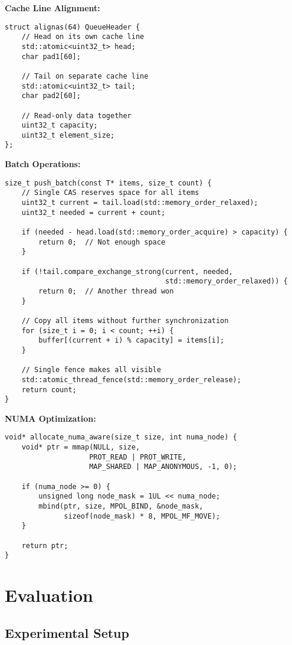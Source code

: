 \documentclass[11pt]{article}
\begin{document}
\textbf{Cache Line Alignment:}
\begin{lstlisting}
struct alignas(64) QueueHeader {
    // Head on its own cache line
    std::atomic<uint32_t> head;
    char pad1[60];
    
    // Tail on separate cache line  
    std::atomic<uint32_t> tail;
    char pad2[60];
    
    // Read-only data together
    uint32_t capacity;
    uint32_t element_size;
};
\end{lstlisting}

\textbf{Batch Operations:}
\begin{lstlisting}
size_t push_batch(const T* items, size_t count) {
    // Single CAS reserves space for all items
    uint32_t current = tail.load(std::memory_order_relaxed);
    uint32_t needed = current + count;
    
    if (needed - head.load(std::memory_order_acquire) > capacity) {
        return 0;  // Not enough space
    }
    
    if (!tail.compare_exchange_strong(current, needed,
                                      std::memory_order_relaxed)) {
        return 0;  // Another thread won
    }
    
    // Copy all items without further synchronization
    for (size_t i = 0; i < count; ++i) {
        buffer[(current + i) % capacity] = items[i];
    }
    
    // Single fence makes all visible
    std::atomic_thread_fence(std::memory_order_release);
    return count;
}
\end{lstlisting}

\textbf{NUMA Optimization:}
\begin{lstlisting}
void* allocate_numa_aware(size_t size, int numa_node) {
    void* ptr = mmap(NULL, size, 
                    PROT_READ | PROT_WRITE,
                    MAP_SHARED | MAP_ANONYMOUS, -1, 0);
    
    if (numa_node >= 0) {
        unsigned long node_mask = 1UL << numa_node;
        mbind(ptr, size, MPOL_BIND, &node_mask,
              sizeof(node_mask) * 8, MPOL_MF_MOVE);
    }
    
    return ptr;
}
\end{lstlisting}

\section{Evaluation}

\subsection{Experimental Setup}
\end{document}
